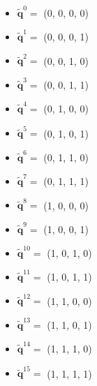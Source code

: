 \documentclass{article}
\theoremstyle{definition}
\begin{document}
\begin{multicols}{4}
  \begin{itemize}
    \item $\mathbf{\tilde{q}}^{0} =$ (0, 0, 0, 0)
    \item $\mathbf{\tilde{q}}^{1} =$ (0, 0, 0, 1)
    \item $\mathbf{\tilde{q}}^{2} =$ (0, 0, 1, 0)
    \item $\mathbf{\tilde{q}}^{3} =$ (0, 0, 1, 1)
    \item $\mathbf{\tilde{q}}^{4} =$ (0, 1, 0, 0)
    \item $\mathbf{\tilde{q}}^{5} =$ (0, 1, 0, 1)
    \item $\mathbf{\tilde{q}}^{6} =$ (0, 1, 1, 0)
    \item $\mathbf{\tilde{q}}^{7} =$ (0, 1, 1, 1)
    \item $\mathbf{\tilde{q}}^{8} =$ (1, 0, 0, 0)
    \item $\mathbf{\tilde{q}}^{9} =$ (1, 0, 0, 1)
    \item $\mathbf{\tilde{q}}^{10} =$ (1, 0, 1, 0)
    \item $\mathbf{\tilde{q}}^{11} =$ (1, 0, 1, 1)
    \item $\mathbf{\tilde{q}}^{12} =$ (1, 1, 0, 0)
    \item $\mathbf{\tilde{q}}^{13} =$ (1, 1, 0, 1)
    \item $\mathbf{\tilde{q}}^{14} =$ (1, 1, 1, 0)
    \item $\mathbf{\tilde{q}}^{15} =$ (1, 1, 1, 1)
  \end{itemize}
\end{multicols}
\end{document}
